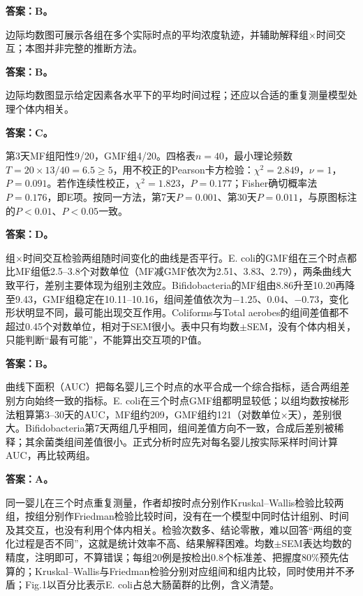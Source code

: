 
\textbf{答案：B。}

边际均数图可展示各组在多个实际时点的平均浓度轨迹，并辅助解释组×时间交互；本图并非完整的推断方法。



\textbf{答案：B。}

边际均数图显示给定因素各水平下的平均时间过程；还应以合适的重复测量模型处理个体内相关。



\textbf{答案：C。}

第3天MF组阳性9/20，GMF组4/20。四格表\(n=40\)，最小理论频数\(T=20\times13/40=6.5\ge5\)，用不校正的Pearson卡方检验：\(\chi^2=2.849\)，\(\nu=1\)，\(P=0.091\)。若作连续性校正，\(\chi^2=1.823\)，\(P=0.177\)；Fisher确切概率法\(P=0.176\)，即E项。按同一方法，第7天\(P=0.001\)、第30天\(P=0.011\)，与原图标注的\(P<0.01\)、\(P<0.05\)一致。



\textbf{答案：D。}

组\(\times\)时间交互检验两组随时间变化的曲线是否平行。E. coli的GMF组在三个时点都比MF组低2.5--3.8个对数单位（MF减GMF依次为2.51、3.83、2.79），两条曲线大致平行，差别主要体现为组别主效应。Bifidobacteria的MF组由8.86升至10.20再降至9.43，GMF组稳定在10.11--10.16，组间差值依次为\(-1.25\)、0.04、\(-0.73\)，变化形状明显不同，最可能出现交互作用。Coliforms与Total aerobes的组间差值都不超过0.45个对数单位，相对于SEM很小。表中只有均数\(\pm\)SEM，没有个体内相关，只能判断``最有可能''，不能算出交互项的P值。



\textbf{答案：B。}

曲线下面积（AUC）把每名婴儿三个时点的水平合成一个综合指标，适合两组差别方向始终一致的指标。E. coli在三个时点GMF组都明显较低；以组均数按梯形法粗算第3--30天的AUC，MF组约209，GMF组约121（对数单位\(\times\)天），差别很大。Bifidobacteria第7天两组几乎相同，组间差值方向不一致，合成后差别被稀释；其余菌类组间差值很小。正式分析时应先对每名婴儿按实际采样时间计算AUC，再比较两组。



\textbf{答案：A。}

同一婴儿在三个时点重复测量，作者却按时点分别作Kruskal--Wallis检验比较两组，按组分别作Friedman检验比较时间，没有在一个模型中同时估计组别、时间及其交互，也没有利用个体内相关。检验次数多、结论零散，难以回答``两组的变化过程是否不同''，这就是统计效率不高、结果解释困难。均数\(\pm\)SEM表达均数的精度，注明即可，不算错误；每组20例是按检出0.8个标准差、把握度80\%预先估算的；Kruskal--Wallis与Friedman检验分别对应组间和组内比较，同时使用并不矛盾；Fig.1以百分比表示E. coli占总大肠菌群的比例，含义清楚。



